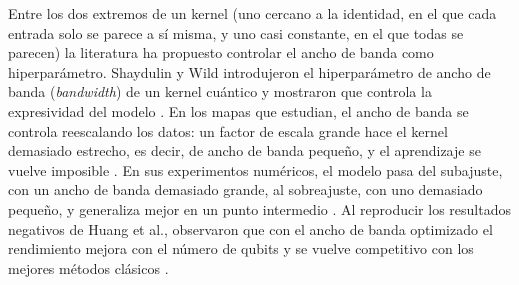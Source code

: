 Entre los dos extremos de un kernel (uno cercano a la identidad, en el que cada entrada solo se parece a sí misma, y uno casi constante, en el que todas se parecen) la literatura ha propuesto controlar el ancho de banda como hiperparámetro.
Shaydulin y Wild introdujeron el hiperparámetro de ancho de banda (\textit{bandwidth}) de un kernel cuántico y mostraron que controla la expresividad del modelo \cite{Shaydulin2022Bandwidth}.
En los mapas que estudian, el ancho de banda se controla reescalando los datos: un factor de escala grande hace el kernel demasiado estrecho, es decir, de ancho de banda pequeño, y el aprendizaje se vuelve imposible \cite{Shaydulin2022Bandwidth}.
En sus experimentos numéricos, el modelo pasa del subajuste, con un ancho de banda demasiado grande, al sobreajuste, con uno demasiado pequeño, y generaliza mejor en un punto intermedio \cite{Shaydulin2022Bandwidth}.
Al reproducir los resultados negativos de Huang et al., observaron que con el ancho de banda optimizado el rendimiento mejora con el número de qubits y se vuelve competitivo con los mejores métodos clásicos \cite{Shaydulin2022Bandwidth}.

